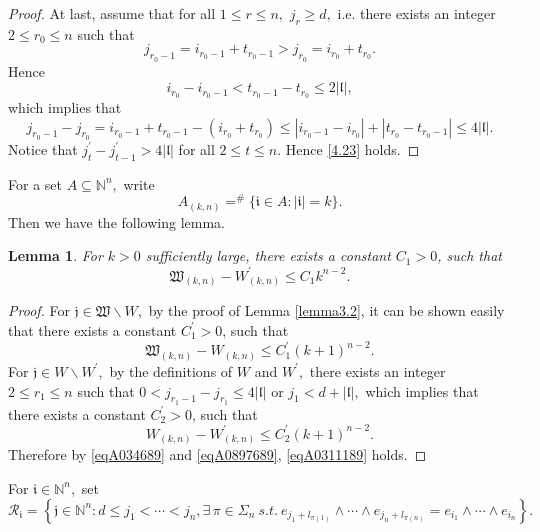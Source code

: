 \documentclass[11pt]{article}
\theoremstyle{plain}
\newtheorem{lem}[thm]{Lemma}
\theoremstyle{definition}
\begin{document}
{\begin{proof}
At last, assume that for all $1 \leq r\leq n,$ $j_{r}\geq d,$
i.e. there exists an integer $2\leq r_0\leq n$ such that $$j_{r_0-1}=i_{r_0-1}+t_{r_0-1}>j_{r_0}=i_{r_0}+t_{r_0}.$$
Hence $$i_{r_0}-i_{r_0-1} < t_{r_0-1}-t_{r_0}\leq 2|\mathfrak{l}|,$$
which implies that $$j_{r_0-1}-j_{r_0}=i_{r_0-1}+t_{r_0-1}-(i_{r_0}+t_{r_0})\leq |i_{r_0-1}-i_{r_0}|+|t_{r_0}-t_{r_0-1}|\leq 4|\mathfrak{l}|.$$
Notice that $j_t^{\prime}- j_{t-1}^{\prime}> 4 |\mathfrak{l}|$ for all $2\leq t\leq n.$ Hence 
\eqref{4.23} holds.
  \end{proof}
  
  For a set $A\subseteq \mathbb N^n,$ write \begin{equation}\label{wkn}A_{(k,n)}=^{\#  }\{\mathfrak{i}\in A: |\mathfrak{i}|=k\}.\end{equation}
Then we have the following lemma.
\begin{lem}
  For $k> 0$ sufficiently large, there exists a constant $C_1>0$, such that 
  \begin{equation}\label{eqA0311189}\mathfrak{W}_{(k,n)}- W^{\prime}_{(k,n)}\leq C_1k^{n-2}.\end{equation}
\end{lem}
\begin{proof}
For $\mathfrak{j}\in \mathfrak{W}\backslash W,$ by the proof of Lemma \ref{lemma3.2}, 
it can be shown easily that there exists a constant $C_1^{\prime}>0$, such that 
 \begin{equation}\label{eqA034689}\mathfrak{W}_{(k,n)}- W_{(k,n)}\leq C_1^{\prime}\left ( k+1 \right ) ^{n-2}.\end{equation}
 For $\mathfrak{j}\in W\backslash W^{\prime},$ by the definitions of $W$ and $W^{\prime},$ there exists an integer $2\leq r_1\leq n$ such that  $0< j_{r_1-1}-j_{r_1}\leq 4|\mathfrak{l}|$ or $j_1<d+|\mathfrak{l}|,$ which implies that there exists a constant $C_2^{\prime}>0$, such that 
 \begin{equation}\label{eqA0897689}W_{(k,n)}- W^{\prime}_{(k,n)}\leq C_2^{\prime}\left ( k+1 \right ) ^{n-2}.\end{equation}
Therefore by \eqref{eqA034689} and \eqref{eqA0897689}, \eqref{eqA0311189} holds.
\end{proof}
For $\mathfrak{i} \in\mathbb N^n,$ set
\begin{equation}\label{A78}
	\mathcal{R}_{\mathfrak{i}}=\left\{\mathfrak{j} \in\mathbb N^n: d\leq j_1< \cdots < j_n,  \exists \, \pi \in \Sigma_{n}~s.t.~  e_{j_1+l_{\pi(1)}} \wedge \cdots \wedge e_{j_n+l_{\pi(n)}}=e_{i_1} \wedge \cdots \wedge e_{i_n}\right\}.

\end{equation}}
\end{document}
